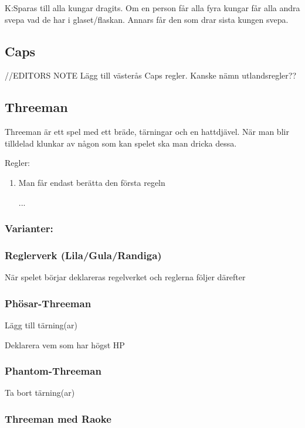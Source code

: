K:Sparas till alla kungar dragits. Om en person får alla fyra kungar får alla andra svepa vad de har i glaset/flaskan.
Annars får den som drar sista kungen svepa.
\subsection*{\textbf{Caps}}

//EDITORS NOTE Lägg till västerås Caps regler. Kanske nämn utlandsregler??

\subsection*{\textbf{Threeman}}

Threeman är ett spel med ett bräde, tärningar och en hattdjävel. När man blir
tilldelad klunkar av någon som kan spelet ska man dricka dessa.

Regler:

\begin{enumerate}
    \item Man får endast berätta den första regeln
    \item[...]
\end{enumerate}

\subsubsection*{Varianter:}

\subsubsection*{Reglerverk (Lila/Gula/Randiga)}

När spelet börjar deklareras regelverket och reglerna följer därefter

\subsubsection*{Phösar-Threeman}

Lägg till tärning(ar)

Deklarera vem som har högst HP

\subsubsection*{Phantom-Threeman}

Ta bort tärning(ar)

\subsubsection*{Threeman med Raoke}

